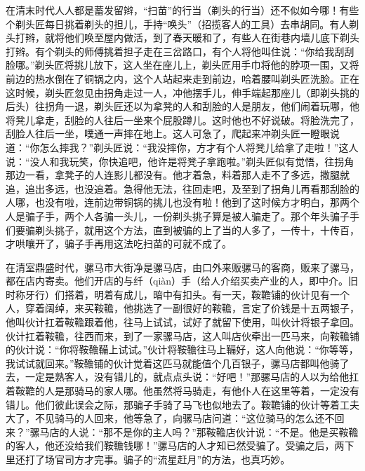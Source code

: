\documentclass[12pt,UTF8]{ctexbook}
\begin{document}
在清末时代人人都是蓄发留辫，“扫苗”的行当（剃头的行当）还不似如今哪！有些个剃头匠每日挑着剃头的担儿，手持“唤头”（招揽客人的工具）去串胡同。有人剃头打辫，就将他们唤至屋内做活，到了春天暖和了，有些人在街巷内墙儿底下剃头打辫。有个剃头的师傅挑着担子走在三岔路口，有个人将他叫住说：“你给我刮刮脸哪。”剃头匠将挑儿放下，这人坐在座儿上，剃头匠用手巾将他的脖项一围，又将前边的热水倒在了铜锅之内，这个人站起来走到前边，哈着腰叫剃头匠洗脸。正在这时候，剃头匠忽见由拐角走过一人，冲他摆手儿，伸手端起那座儿（即剃头挑的后头）往拐角一退，剃头匠还以为拿凳的人和刮脸的人是朋友，他们闹着玩哪，他将凳儿拿走，刮脸的人往后一坐来个屁股蹲儿。这时他也不好说破。将脸洗完了，刮脸人往后一坐，噗通一声摔在地上。这人可急了，爬起来冲剃头匠一瞪眼说道：“你怎么摔我？”剃头匠说：“我没摔你，方才有个人将凳儿给拿了走啦！”这人说：“没人和我玩笑，你快追吧，他许是将凳子拿跑啦。”剃头匠似有觉悟，往拐角那边一看，拿凳子的人连影儿都没有。他才着急，料着那人走不了多远，撒腿就追，追出多远，也没追着。急得他无法，往回走吧，及至到了拐角儿再看那刮脸的人哪，也没有啦，连前边带铜锅的挑儿也没有啦！他到了这时候方才明白，那两个人是骗子手，两个人各骗一头儿，一份剃头挑子算是被人骗走了。那个年头骗子手们要骗剃头挑子，就用这个方法，直到被骗的上了当的人多了，一传十，十传百，才哄嚷开了，骗子手再用这法吃扫苗的可就不成了。

在清室鼎盛时代，骡马市大街净是骡马店，由口外来贩骡马的客商，贩来了骡马，都在店内寄卖。他们开店的与纤（qiàn）手（给人介绍买卖产业的人，即中介。旧时称牙行）们搭着，明着有成儿，暗中有扣头。有一天，鞍韂铺的伙计见有一个人，穿着阔绰，来买鞍韂，他挑选了一副很好的鞍韂，言定了价钱是十五两银子，他叫伙计扛着鞍韂跟着他，往马上试试，试好了就留下使用，叫伙计将银子拿回。伙计扛着鞍韂，往西而来，到了一家骡马店，这人叫店伙牵出一匹马来，向鞍韂铺的伙计说：“你将鞍韂鞴上试试。”伙计将鞍韂往马上鞴好，这人向他说：“你等等，我试试就回来。”鞍韂铺的伙计觉着这匹马就能值个几百银子，骡马店都叫他骑了去，一定是熟客人，没有错儿的，就点点头说：“好吧！”那骡马店的人以为给他扛着鞍韂的人是那骑马的家人哪。他虽然将马骑走，有他仆人在这里等着，一定没有错儿。他们彼此误会之际，那骗子手骑了马飞也似地去了。鞍韂铺的伙计等着工夫大了，不见骑马的人回来，他等急了，向骡马店问道：“这位骑马的怎么还不回来？”骡马店的人说：“那不是你的主人吗？”那鞍韂店伙计说：“不是。他是买鞍韂的客人，他还没给我们鞍韂钱哪！”骡马店的人才知已然受骗了。受骗之后，两下里还打了场官司方才完事。骗子的“流星赶月”的方法，也真巧妙。
\end{document}
